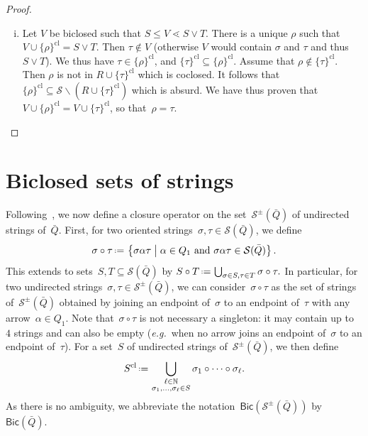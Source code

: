 \documentclass{amsart}
\theoremstyle{definition}
\newcommand{\N}{\mathbb{N}} %
\newcommand{\cS}{\mathcal{S}} %
\newcommand{\set}[2]{\left\{ #1 \;\middle|\; #2 \right\}} %
\newcommand{\ssm}{\smallsetminus} %
\newcommand{\eqdef}{\mbox{\,\raisebox{0.2ex}{\scriptsize\ensuremath{\mathrm:}}\ensuremath{=}\,}} %
\newcommand{\eg}{\textit{e.g.}~} %
\newcommand{\strings}{\mathcal{S}} %
\newcommand{\closure}[1]{#1^{\mathrm{cl}}} %
\newcommand{\Bicl}[1]{\mathsf{Bic}(#1)} %
\begin{document}
\begin{proof}
\begin{enumerate}[(i)]
\item Let $V$ be biclosed such that ${S \leq V \lessdot S \vee T}$.
There is a unique $\rho$ such that ${V \cup \closure{\{\rho\}} = S \vee T}$.
Then $\tau\notin V$ (otherwise $V$ would contain $\sigma$ and $\tau$ and thus $S\vee T$).
We thus have $\tau\in\closure{\{\rho\}}$, and $\closure{\{\tau\}}\subseteq\closure{\{\rho\}}$.
Assume that $\rho\notin\closure{\{\tau\}}$.
Then $\rho$ is not in $R\cup\closure{\{\tau\}}$ which is coclosed.
It follows that~$\closure{\{\rho\}}\subseteq \cS\ssm \left(R\cup\closure{\{\tau\}}\right)$ which is absurd.
We have thus proven that~$V \cup \closure{\{\rho\}} = V \cup \closure{\{\tau\}}$, so that~$\rho=\tau$.
\qedhere
\end{enumerate}
\end{proof}

\section{Biclosed sets of strings}
\label{sec:biclosedStrings}

Following~\cite[Sect.~6]{McConville}, we now define a closure operator on the set~$\strings^\pm(\bar Q)$ of undirected strings of~$\bar Q$.
First, for two oriented strings~$\sigma, \tau \in \strings(\bar Q)$, we define
\[
\sigma \circ \tau \eqdef \set{\sigma \alpha \tau}{\alpha \in Q_1 \text{ and } \sigma \alpha \tau \in \strings(\bar Q)}.
\]
This extends to sets~$S,T \subseteq \strings(\bar Q)$ by
\(
S \circ T \eqdef \bigcup_{\sigma \in S, \tau \in T} \sigma \circ \tau.
\)
In particular, for two undirected strings~$\sigma, \tau \in \strings^\pm(\bar Q)$, we can consider~$\sigma \circ \tau$ as the set of strings of~$\strings^\pm(\bar Q)$ obtained by joining an endpoint of~$\sigma$ to an endpoint of~$\tau$ with any arrow~$\alpha \in Q_1$.
Note that~$\sigma \circ \tau$ is not necessary a singleton: it may contain up to~$4$ strings and can also be empty (\eg when no arrow joins an endpoint of~$\sigma$ to an endpoint of~$\tau$).
For a set~$S$ of undirected strings of~$\strings^\pm(\bar Q)$, we then define
\[
\closure{S} \eqdef \bigcup_{\substack{\ell \in \N \\ \sigma_1, \dots, \sigma_\ell \in S}} \sigma_1 \circ \dots \circ \sigma_\ell.
\]
As there is no ambiguity, we abbreviate the notation~$\Bicl{\strings^\pm(\bar Q)}$ by~$\Bicl{\bar Q}$.
\end{document}
